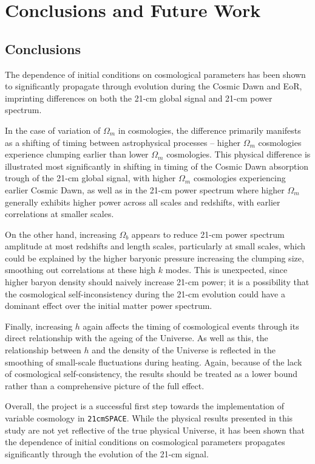 \documentclass[floats,floatfix,showpacs,amssymb,prd,superscriptaddress,nofootinbib]{revtex4-2} %
\newcommand{\code}{\texttt}
\begin{document}
\newpage
\section{Conclusions and Future Work}
\subsection{Conclusions}
The dependence of initial conditions on cosmological parameters has been shown to significantly propagate through evolution during the Cosmic Dawn and EoR, imprinting differences on both the 21-cm global signal and 21-cm power spectrum. 

In the case of variation of $\Omega_m$ in cosmologies, the difference primarily manifests as a shifting of timing between astrophysical processes -- higher $\Omega_m$ cosmologies experience clumping earlier than lower $\Omega_m$ cosmologies. This physical difference is illustrated most significantly in shifting in timing of the Cosmic Dawn absorption trough of the 21-cm global signal, with higher $\Omega_m$ cosmologies experiencing earlier Cosmic Dawn, as well as in the 21-cm power spectrum where higher $\Omega_m$ generally exhibits higher power across all scales and redshifts, with earlier correlations at smaller scales.

On the other hand, increasing $\Omega_b$ appears to reduce 21-cm power spectrum amplitude at most redshifts and length scales, particularly at small scales, which could be explained by the higher baryonic pressure increasing the clumping size, smoothing out correlations at these high $k$ modes. This is unexpected, since higher baryon density should naively increase 21-cm power; it is a possibility that the cosmological self-inconsistency during the 21-cm evolution could have a dominant effect over the initial matter power spectrum.

Finally, increasing $h$ again affects the timing of cosmological events through its direct relationship with the ageing of the Universe. As well as this, the relationship between $h$ and the density of the Universe is reflected in the smoothing of small-scale fluctuations during heating. Again, because of the lack of cosmological self-consistency, the results should be treated as a lower bound rather than a comprehensive picture of the full effect.

Overall, the project is a successful first step towards the implementation of variable cosmology in \code{21cmSPACE}. While the physical results presented in this study are not yet reflective of the true physical Universe, it has been shown that the dependence of initial conditions on cosmological parameters propagates significantly through the evolution of the 21-cm signal. 
\end{document}
